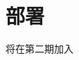 \documentclass[../main.tex]{subfiles}
\begin{document}
\chapter{部署}

\vspace{-2cm}

将在第二期加入
\end{document}
